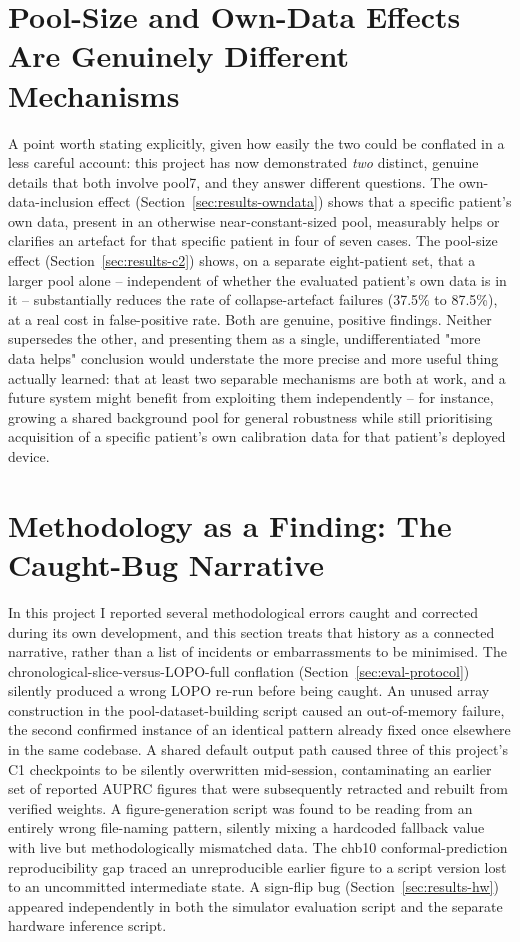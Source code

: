 \section{Pool-Size and Own-Data Effects Are Genuinely Different Mechanisms}

A point worth stating explicitly, given how easily the two could be conflated in a less careful account: this project has now demonstrated \emph{two} distinct, genuine details that 
both involve pool7, and they answer different questions. The own-data-inclusion effect (Section~\ref{sec:results-owndata}) shows that a specific patient's own data, present in an 
otherwise near-constant-sized pool, measurably helps or clarifies an artefact for that specific patient in four of seven cases. The pool-size effect (Section~\ref{sec:results-c2}) 
shows, on a separate eight-patient set, that a larger pool alone -- independent of whether the evaluated patient's own data is in it -- substantially reduces the rate of 
collapse-artefact failures (37.5\% to 87.5\%), at a real cost in false-positive rate. Both are genuine, positive findings. Neither supersedes the other, and presenting them as a 
single, undifferentiated "more data helps" conclusion would understate the more precise and more useful thing actually learned: that at least two separable mechanisms 
are both at work, and a future system might benefit from exploiting them independently -- for instance, growing a shared background pool for general robustness while still prioritising 
acquisition of a specific patient's own calibration data for that patient's deployed device.

\section{Methodology as a Finding: The Caught-Bug Narrative}

In this project I reported several methodological errors caught and corrected during its own development, and this section treats that history as a connected narrative, 
rather than a list of incidents or embarrassments to be minimised. The chronological-slice-versus-LOPO-full conflation (Section~\ref{sec:eval-protocol}) silently produced a wrong LOPO 
re-run before being caught. An unused array construction in the pool-dataset-building script caused an out-of-memory failure, the second confirmed instance of an identical pattern 
already fixed once elsewhere in the same codebase. A shared default output path caused three of this project's C1 checkpoints to be silently overwritten mid-session, contaminating an 
earlier set of reported AUPRC figures that were subsequently retracted and rebuilt from verified weights. A figure-generation script was found to be reading from an entirely wrong 
file-naming pattern, silently mixing a hardcoded fallback value with live but methodologically mismatched data. The chb10 conformal-prediction reproducibility gap 
traced an unreproducible earlier figure to a script version lost to an uncommitted intermediate state. A sign-flip bug (Section~\ref{sec:results-hw}) 
appeared independently in both the simulator evaluation script and the separate hardware inference script.

